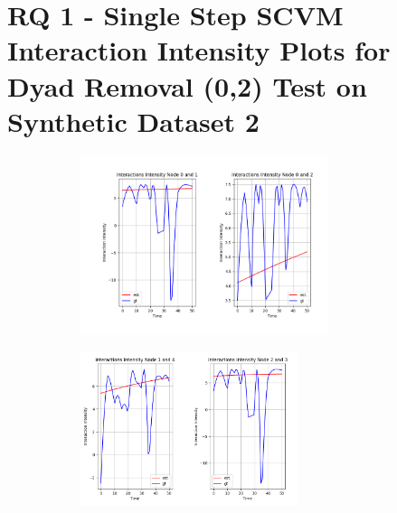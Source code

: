 \section{RQ 1 - Single Step SCVM Interaction Intensity Plots for Dyad Removal (0,2) Test on Synthetic Dataset 2}
\label{appendix:rq1:part2:1step_dyad_remove}
\begin{figure}[H]
    \centering
    \begin{subfigure}[b]{\textwidth}
        \centering
        \includegraphics[width=0.8\textwidth]{0_images/appendix_rq1_dyad_removal_single_step1.png}
    \end{subfigure}
    \vfill
    \begin{subfigure}[b]{\textwidth}
        \centering
        \includegraphics[width=0.7\textwidth]{0_images/appendix_rq1_dyad_removal_single_step2.png}
    \end{subfigure}
\end{figure}
